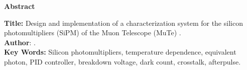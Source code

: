 \newpage
\begin{center}
\begin{Large}
\textbf{Abstract}
\end{Large}
\end{center}


\noindent \textbf{Title:} Design and implementation of a characterization system for the silicon photomultipliers (SiPM) of the Muon Telescope (MuTe) \footnotemark[1].\\ 



\noindent \textbf{Author}: \insertautoruno \footnotemark[2].   \\    


 
\noindent \textbf{Key Words:} Silicon photomultipliers, temperature dependence, equivalent photon, PID controller, breakdown voltage, dark count, crosstalk, afterpulse.\\

